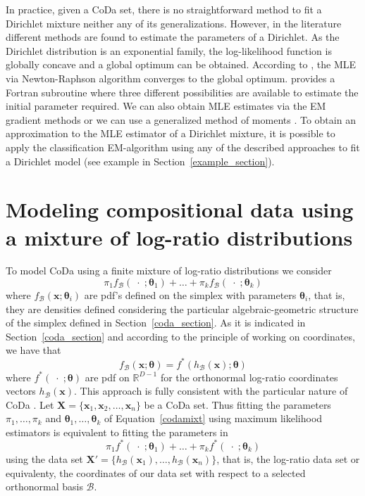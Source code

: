 \documentclass[12pt, a4paper]{article}
\newcommand{\m}[1]{\boldsymbol{#1}}
\begin{document}
In practice, given a CoDa set, there is no straightforward method to fit a Dirichlet mixture neither any of its generalizations. However, in the literature different methods are found to estimate the parameters of a Dirichlet. As the Dirichlet distribution is an exponential family, the log-likelihood function is globally concave and a global optimum can be obtained. According to \cite{ng2011dirichlet}, the MLE via Newton-Raphson algorithm converges to the global optimum. \cite{narayanan1991algorithm} provides a Fortran subroutine where three different possibilities are available to estimate the initial parameter required.
We can also obtain MLE estimates via the EM gradient methods \citep{ng2011dirichlet} or we can use a generalized method of moments
\citep{hansen1982large}.  
To obtain an approximation to the MLE estimator of a Dirichlet mixture, it is possible to apply the classification EM-algorithm \citep{celeux1992classification} using any of the described approaches to fit a Dirichlet model (see example in Section~\ref{example_section}).



\section{Modeling compositional data using a mixture of log-ratio distributions}
\label{codamix_section}

\noindent To model CoDa using a finite mixture of log-ratio distributions we consider 
\begin{equation}
\pi_1 f_\mathcal{B}(\;\cdot\; ; \m\theta_1) + \dots + \pi_k f_\mathcal{B}(\;\cdot\; ; \m\theta_k)
\label{codamixt}
\end{equation}
where $f_\mathcal{B}(\textbf{x} ; \m\theta_i)$ are pdf's defined on the simplex with parameters $\m\theta_i$, that is, they are densities defined considering the particular algebraic-geometric structure of the simplex defined in Section~\ref{coda_section}. As it is indicated in Section~\ref{coda_section} and according to the principle of working on coordinates, we have that
\[f_\mathcal{B}(\textbf{x} ; \m\theta) = f^*(h_\mathcal{B}(\textbf{x}) ; \m\theta)\]
where $f^*(\;\cdot\; ; \m\theta)$ are pdf on $\mathbb{R}^{D-1}$ for the orthonormal log-ratio coordinates vectors $h_\mathcal{B}(\textbf{x})$. This approach is fully consistent with the particular nature of CoDa \citep{aitchison1986statistical}. Let $\mathbf{X} =  \{ \textbf{x}_1, \textbf{x}_2, \dots , \textbf{x}_n \}$ be a CoDa set. 
Thus fitting the parameters $\pi_1, \dots, \pi_k$ and $\m\theta_1, \dots, \m\theta_k$ of Equation~\ref{codamixt} using maximum likelihood estimators is equivalent to fitting the parameters in
\begin{equation}
\pi_1 f^*(\;\cdot\; ; \m\theta_1) + \dots + \pi_k f^*(\;\cdot\; ; \m\theta_k)
\label{coordmixt}
\end{equation}
using the data set $\mathbf{X}' = \{ h_\mathcal{B}(\mathbf{x}_1), \dots, h_\mathcal{B}(\mathbf{x}_n) \}$, that is, the log-ratio data set or equivalenty, the coordinates of our data set with respect to a selected orthonormal basis $\mathcal{B}$.
\end{document}
